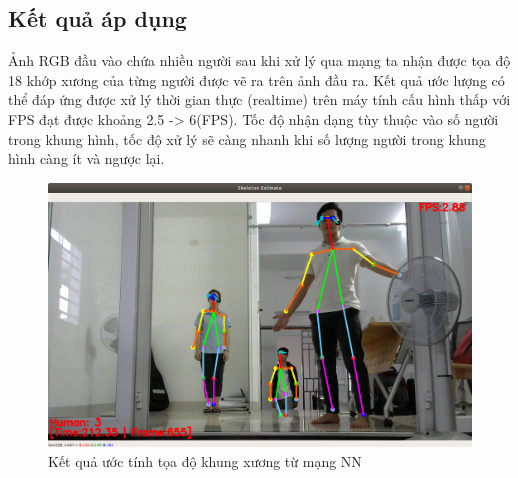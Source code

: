\subsection{Kết quả áp dụng}
Ảnh RGB đầu vào chứa nhiều người sau khi xử lý qua mạng ta nhận được tọa độ 18 khớp xương của từng người được vẽ ra trên ảnh đầu ra. Kết quả ước lượng có thể đáp ứng được xử lý thời gian thực (realtime) trên máy tính cấu hình thấp với FPS đạt được khoảng 2.5 -> 6(FPS). Tốc độ nhận dạng tùy thuộc vào số người trong khung hình, tốc độ xử lý sẽ càng nhanh khi số lượng người trong khung hình càng ít và ngược lại.

\FloatBarrier
\begin{figure}[htp]
\begin{center}
\includegraphics[scale=0.37]{chap3/c3_figs/skeleton_out.png}
\end{center}
\caption{Kết quả ước tính tọa độ khung xương từ mạng NN}
\label{fig:kq_skeleton}
\end{figure}
\FloatBarrier

